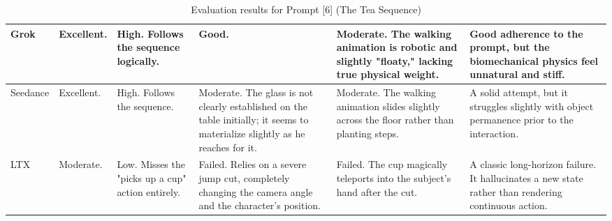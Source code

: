 \documentclass[sigconf]{acmart}
\begin{document}
\begin{table}[t]
\begin{tabularx}{\textwidth}{| l | >{\raggedright\arraybackslash}X | >{\raggedright\arraybackslash}X | >{\raggedright\arraybackslash}X | >{\raggedright\arraybackslash}X | >{\raggedright\arraybackslash}X |}
        Grok           & Excellent.                          & High. Follows the sequence logically.                                                 & Good.                                                                                                                         & Moderate. The walking animation is robotic and slightly "floaty," lacking true physical weight.                        & Good adherence to the prompt, but the biomechanical physics feel unnatural and stiff.                                                        \\ \hline
        Seedance       & Excellent.                          & High. Follows the sequence.                                                           & Moderate. The glass is not clearly established on the table initially; it seems to materialize slightly as he reaches for it. & Moderate. The walking animation slides slightly across the floor rather than planting steps.                           & A solid attempt, but it struggles slightly with object permanence prior to the interaction.                                                  \\ \hline
        LTX            & Moderate.                           & Low. Misses the "picks up a cup" action entirely.                                     & Failed. Relies on a severe jump cut, completely changing the camera angle and the character's position.                       & Failed. The cup magically teleports into the subject's hand after the cut.                                             & A classic long-horizon failure. It hallucinates a new state rather than rendering continuous action.                                         \\ \hline
    \end{tabularx}
    \caption{Evaluation results for Prompt [6] (The Tea Sequence)}
    \label{tab:eval_prompt_3}
\end{table}
\end{document}
